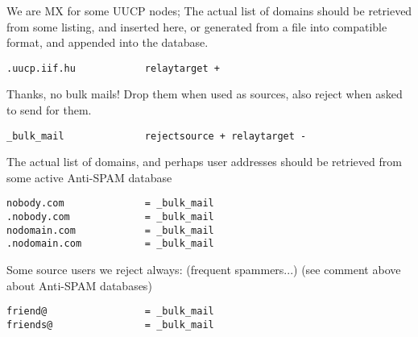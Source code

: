 We are MX for some UUCP nodes;  The actual list of domains should
be retrieved from some listing, and inserted here, or generated from
a file into compatible format, and appended into the database.

\begin{tscreen}
\begin{verbatim}
.uucp.iif.hu            relaytarget +
\end{verbatim}
\end{tscreen}


Thanks, no bulk mails! Drop them when used as sources, also reject
when asked to send for them.

\begin{tscreen}
\begin{verbatim}
_bulk_mail              rejectsource + relaytarget -
\end{verbatim}
\end{tscreen}


The actual list of domains, and perhaps user addresses should
be retrieved from some active Anti-SPAM database

\begin{tscreen}
\begin{verbatim}
nobody.com              = _bulk_mail
.nobody.com             = _bulk_mail
nodomain.com            = _bulk_mail
.nodomain.com           = _bulk_mail
\end{verbatim}
\end{tscreen}


Some source users we reject always: (frequent spammers...)
(see comment above about Anti-SPAM databases)

\begin{tscreen}
\begin{verbatim}
friend@                 = _bulk_mail
friends@                = _bulk_mail
\end{verbatim}
\end{tscreen}

